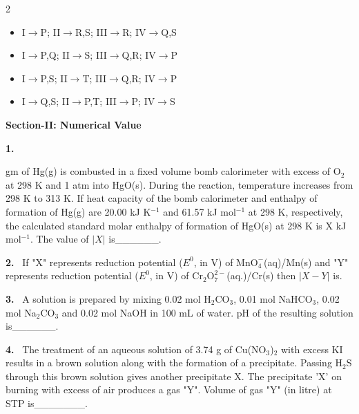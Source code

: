 \documentclass[10pt]{extarticle}
\newcommand{\sect}[1]{\par\smallskip\noindent\textbf{#1}\par}
\newcommand{\qn}[1]{\par\smallskip\noindent\textbf{#1.}~}
\newenvironment{qoptions}{\begin{itemize}[leftmargin=1.8em,itemsep=1pt,topsep=2pt,label={}]}{\end{itemize}}
\newcommand{\opt}[2]{\item[(#1)] #2}
\begin{document}
\begin{multicols}{2}
\begin{qoptions}
\opt{A}{I$\to$P; II$\to$R,S; III$\to$R; IV$\to$Q,S}
\opt{B}{I$\to$P,Q; II$\to$S; III$\to$Q,R; IV$\to$P}
\opt{C}{I$\to$P,S; II$\to$T; III$\to$Q,R; IV$\to$P}
\opt{D}{I$\to$Q,S; II$\to$P,T; III$\to$P; IV$\to$S}
\end{qoptions}

\sect{Section-II: Numerical Value}

\qn{1} { gm of Hg(g) is combusted in a fixed volume bomb calorimeter with excess of O$_2$ at 298 K and 1 atm into HgO(s). During the reaction, temperature increases from 298 K to 313 K. If heat capacity of the bomb calorimeter and enthalpy of formation of Hg(g) are 20.00 kJ K$^{-1}$ and 61.57 kJ mol$^{-1}$ at 298 K, respectively, the calculated standard molar enthalpy of formation of HgO(s) at 298 K is X kJ mol$^{-1}$. The value of $|X|$ is\_\_\_\_\_\_.\par}
\relax[Given: Gas constant $R = 8$ J K$^{-1}$mol$^{-1}$, Hg = 200 gm/mol]

\qn{2} If "X" represents reduction potential ($E^0$, in V) of $\mathrm{MnO_4^-}$(aq)/Mn(s) and "Y" represents reduction potential ($E^0$, in V) of $\mathrm{Cr_2O_7^{2-}}$(aq.)/Cr(s) then $|X-Y|$ is.\\
\par\noindent\resizebox{\linewidth}{!}{[Given: $E^0_{(\mathrm{MnO_4^-(aq)/MnO_2(s)})} = 1.68$V; $E^0_{(\mathrm{MnO_2(s)/Mn^{2+}(aq)})} = 1.21$V; $E^0_{(\mathrm{Mn^{2+}(aq)/Mn(s)})} = -1.03$V]}\par
{\sloppy\relax[$E^0_{(\mathrm{Cr_2O_7^{2-}(aq.)/Cr^{3+}(aq.)})} = 1.33$V; $E^0_{(\mathrm{Cr^{3+}(aq.)/Cr(s)})} = -0.74$V]}

\qn{3} A solution is prepared by mixing 0.02 mol H$_2$CO$_3$, 0.01 mol NaHCO$_3$, 0.02 mol Na$_2$CO$_3$ and 0.02 mol NaOH in 100 mL of water. pH of the resulting solution is\_\_\_\_\_\_.\\
\relax[Given: $pK_{a_1}$ and $pK_{a_2}$ of H$_2$CO$_3$ are 6.37 and 10.32, respectively; $\log 2 = 0.30$, $\log 3 = 0.47$]

\qn{4} The treatment of an aqueous solution of 3.74 g of Cu(NO$_3$)$_2$ with excess KI results in a brown solution along with the formation of a precipitate. Passing H$_2$S through this brown solution gives another precipitate X. The precipitate 'X' on burning with excess of air produces a gas "Y". Volume of gas "Y" (in litre) at STP is\_\_\_\_\_\_\_.\\
\relax[Given: Atomic mass of H=1, N=14, O=16, S=32, K=39, Cu=63, I=127]


\end{multicols}
\end{document}
